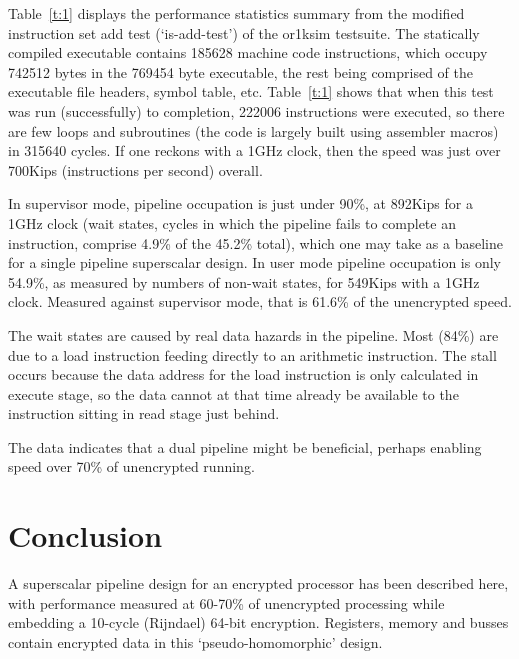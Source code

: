 \documentclass[conference]{IEEEtran}
\begin{document}
Table~\ref{t:1} displays the performance statistics summary from the 
modified instruction set add test (`is-add-test') of the or1ksim
testsuite.  The statically compiled executable contains 185628 machine
code instructions, which occupy 742512 bytes in the 769454 byte
executable, the rest being comprised of the executable file headers,
symbol table, etc.  Table~\ref{t:1} shows that when this test was run
(successfully) to completion, 222006 instructions were executed, so
there are few loops and subroutines (the code is largely built using
assembler macros) in 315640 cycles.  If one reckons with a 1GHz clock,
then the speed was just over 700Kips (instructions per second) overall.

In supervisor mode, pipeline occupation is just under 90\%, at 892Kips
for a 1GHz clock (wait states, cycles in which the pipeline fails to
complete an instruction, comprise 4.9\% of the 45.2\% total), which one
may take as a baseline for a single pipeline superscalar design.  In
user mode pipeline occupation is only 54.9\%, as measured by numbers of
non-wait states, for 549Kips with a 1GHz clock.  Measured against
supervisor mode, that is 61.6\% of the unencrypted speed.

The wait states are caused by real data hazards in the pipeline.  Most
(84\%) are due to a load instruction feeding directly to an arithmetic
instruction.  The stall occurs because the data address for the load
instruction is only calculated in execute stage, so the data cannot
at that time already be available to the instruction sitting in read
stage just behind.

The data indicates that a dual pipeline might be beneficial, perhaps
enabling speed over 70\% of unencrypted running.





















\section{Conclusion}
A superscalar pipeline design for an encrypted processor has been
described here, with performance measured at 60-70\% of unencrypted
processing while embedding a 10-cycle (Rijndael) 64-bit encryption.
Registers, memory and busses contain encrypted data in this
`pseudo-homomorphic' design.



















\end{document}
